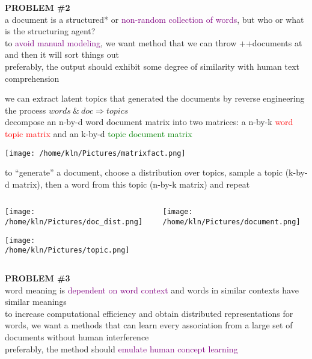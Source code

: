\documentclass[8pt]{beamer}
\begin{document}

\begin{frame}
\textbf{PROBLEM \#2}\\
a document is a structured* or \textcolor{purple}{non-random collection of words}, but who or what is the structuring agent?\\
\medskip
to \textcolor{purple}{avoid manual modeling}, we want method that we can throw ++documents at and then it will sort things out\\
\medskip
preferably, the output should exhibit some degree of similarity with human text comprehension\\
\end{frame}


\begin{frame}
\medskip
we can extract latent topics that generated the documents by reverse engineering the process  $words~ \&~doc \Rightarrow topics$\\
\medskip
decompose an n-by-d word document matrix into two matrices: a n-by-k \textcolor{red}{word topic matrix} and an k-by-d  \textcolor{green}{topic document matrix}\\
	\begin{center}
		\texttt{[image: /home/kln/Pictures/matrixfact.png]}
	\end{center}
\medskip
to ``generate'' a document, choose a distribution over topics, sample a topic (k-by-d matrix), then a word from this topic (n-by-k matrix) and repeat
\end{frame}

\begin{frame}{}
	\begin{columns}
		\begin{column}{.35\textwidth}
			\texttt{[image: /home/kln/Pictures/doc\_dist.png]}
			
			\texttt{[image: /home/kln/Pictures/topic.png]}
		\end{column}
		\begin{column}{.55\textwidth}			 
			\texttt{[image: /home/kln/Pictures/document.png]}
		\end{column}
	\end{columns}
\end{frame}



\begin{frame}
\textbf{PROBLEM \#3}\\
word meaning is \textcolor{purple}{dependent on word context} and words in similar contexts have similar meanings\\  
\medskip
to increase computational efficiency and obtain distributed representations for words, we want a methods that can learn every association from a large set of documents without human interference\\ 
\medskip
preferably, the method should \textcolor{purple}{emulate human concept learning}\\
\end{frame}
\end{document}
